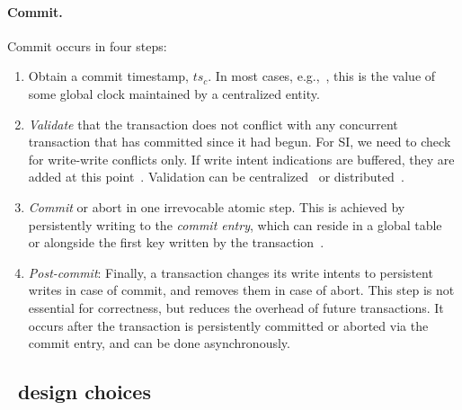 
  \paragraph{Commit.} 
  Commit occurs in four steps:
  \begin{enumerate}
  \item
  Obtain a commit timestamp, $ts_c$. 
  In most cases, e.g.,~\cite{Percolator2010,tephra,OmidICDE2014,Omid2017}, 
  this is the value of some global clock maintained by a centralized entity. 
  \item \emph{Validate} that the transaction does not conflict with any concurrent transaction that has committed since it 
had begun.  For SI, we need to check for write-write conflicts only. 
If write intent indications are buffered, they are added at this point~\cite{Percolator2010}.
Validation can be centralized~\cite{OmidICDE2014,tephra,Omid2017} or distributed~\cite{Percolator2010,cockroach}. 


\item \emph{Commit} or abort in one  irrevocable atomic step. This is achieved by persistently writing to the \emph{commit entry}, 
  which can reside in a global table~\cite{Omid2017,cockroach} or alongside the first  key written by 
  the transaction~\cite{Percolator2010}.  
  
 \item \emph{Post-commit}: 
  Finally, a transaction changes its write intents to
  persistent writes in case of commit, and removes them in case of abort. This
  step is not essential for correctness, but reduces the overhead of future transactions. It
  occurs after the transaction is persistently committed or aborted via the commit entry, 
  and can be done asynchronously.
 \end{enumerate}
 

\subsection{\sys\ design choices}
\label{ssec:ll-txns}

